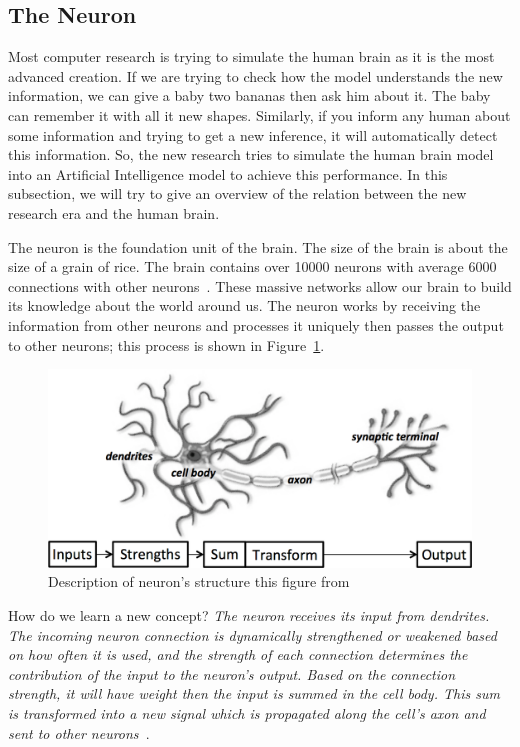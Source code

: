  \subsection{The Neuron}

Most computer research is trying to simulate the human brain as it is the most advanced creation. If we are trying to check how the model understands the new information, we can give a baby two bananas then ask him about it. The baby can remember it with all it new shapes. Similarly, if you inform any human about some information and trying to get a new inference, it will automatically detect this information. So, the new research tries to simulate the human brain model into an Artificial Intelligence model to achieve this performance. In this subsection, we will try to give an overview of the relation between the new research era and the human brain.
 
The neuron is the foundation unit of the brain. The size of the brain is about the size of a grain of rice. The brain contains over 10000 neurons with average 6000 connections with other neurons~\cite{Restak_2001}.  These massive networks allow our brain to build its knowledge about the world around us. The neuron works by receiving the information from other neurons and processes it uniquely then passes the output to other neurons; this process is shown in Figure~\ref{Fig:Neuron_Structure}.%

\begin{figure}[!t] \includegraphics[width=\linewidth]{./Figures/Ch_2_Background/neuron_structure.png}
\caption{Description of neuron's structure this figure from~\cite{DLFundamentals}}
\label{Fig:Neuron_Structure}
\end{figure}%
 
How do we learn a new concept? \textit{The neuron receives its input from dendrites. The incoming neuron connection is dynamically strengthened or weakened based on how often it is used, and the strength of each connection determines the contribution of the input to the neuron's output. Based on the connection strength, it will have weight then the input is summed in the cell body. This sum is transformed into a new signal which is propagated along the cell's axon and sent to other neurons~\cite{DLFundamentals}}.

